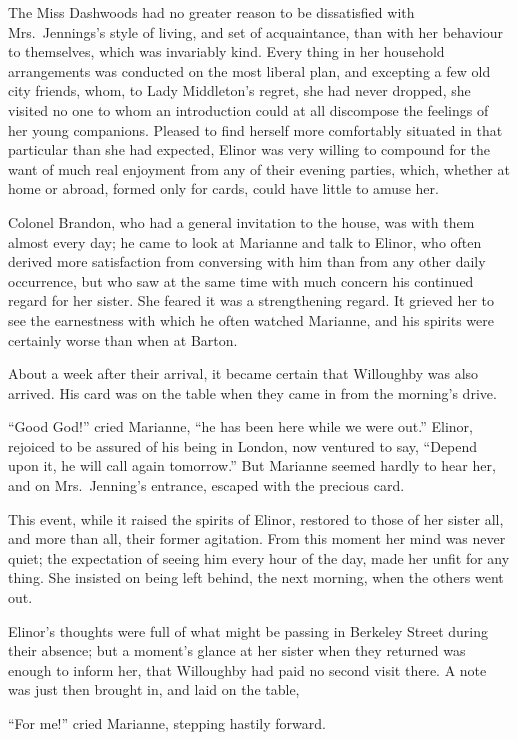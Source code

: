 The Miss Dashwoods had no greater reason to be
dissatisfied with Mrs.\ Jennings's style of living, and set
of acquaintance, than with her behaviour to themselves,
which was invariably kind.  Every thing in her household
arrangements was conducted on the most liberal plan,
and excepting a few old city friends, whom, to Lady
Middleton's regret, she had never dropped, she visited
no one to whom an introduction could at all discompose
the feelings of her young companions.  Pleased to find
herself more comfortably situated in that particular than
she had expected, Elinor was very willing to compound
for the want of much real enjoyment from any of their
evening parties, which, whether at home or abroad,
formed only for cards, could have little to amuse her.

Colonel Brandon, who had a general invitation
to the house, was with them almost every day; he came
to look at Marianne and talk to Elinor, who often derived
more satisfaction from conversing with him than from any
other daily occurrence, but who saw at the same time
with much concern his continued regard for her sister.
She feared it was a strengthening regard.  It grieved her
to see the earnestness with which he often watched Marianne,
and his spirits were certainly worse than when at Barton.

About a week after their arrival, it became
certain that Willoughby was also arrived.  His card
was on the table when they came in from the morning's drive.

``Good God!'' cried Marianne, ``he has been here while
we were out.''  Elinor, rejoiced to be assured of his
being in London, now ventured to say, ``Depend upon it,
he will call again tomorrow.''  But Marianne seemed
hardly to hear her, and on Mrs.\ Jenning's entrance,
escaped with the precious card.

This event, while it raised the spirits of Elinor,
restored to those of her sister all, and more than all,
their former agitation.  From this moment her mind was
never quiet; the expectation of seeing him every hour
of the day, made her unfit for any thing.  She insisted
on being left behind, the next morning, when the others
went out.

Elinor's thoughts were full of what might be passing
in Berkeley Street during their absence; but a moment's
glance at her sister when they returned was enough to
inform her, that Willoughby had paid no second visit there.
A note was just then brought in, and laid on the table,

``For me!'' cried Marianne, stepping hastily forward.

